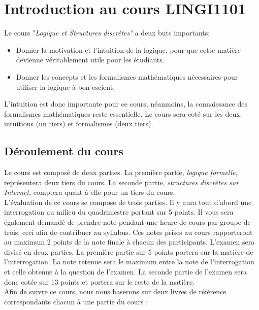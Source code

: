 \chapter*{Introduction au cours LINGI1101}

Le cours "\textit{Logique et Structures discrètes"} a deux buts importants:

\begin{itemize}
\item Donner la motivation et l'intuition de la logique, pour que cette matière devienne véritablement utile pour les étudiants.
\item Donner les concepts et les formalismes mathématiques nécessaires pour utiliser la logique à bon escient.
\end{itemize}


L'intuition est donc importante pour ce cours, néanmoins, la connaissance des formalismes mathématiques reste essentielle.  Le cours sera coté sur les deux: intuitions (un tiers) et formalismes (deux tiers).\\

\section*{Déroulement du cours}

Le cours est composé de deux parties. La première partie, \textit{logique formelle}, représentera deux tiers du cours. La seconde partie, \textit{structures discrètes sur Internet}, comptera quant à elle pour un tiers du cours.\\

L'évaluation de ce cours se compose de trois parties. Il y aura tout d'abord une interrogation au milieu du quadrimestre portant sur 5 points. Il vous sera également demandé de prendre note pendant une heure de cours par groupe de trois, ceci afin de contribuer au syllabus. Ces notes prises au cours rapporteront au maximum 2 points de la note finale à chacun des participants. L'examen sera divisé en deux parties. La première partie sur 5 points portera sur la matière de l'interrogation. La note retenue sera le maximum entre la note de l'interrogation et celle obtenue à la question de l'examen. La seconde partie de l'examen sera donc cotée sur 13 points et portera sur le reste de la matière.\\

Afin de suivre ce cours, nous nous baserons sur deux livres de référence correspondants chacun à une partie du cours :

